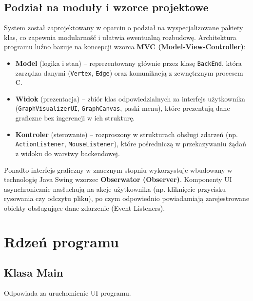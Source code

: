 \documentclass[]{article}
\begin{document}
    
    \clearpage

    \subsection{Podział na moduły i wzorce projektowe}
    System został zaprojektowany w oparciu o podział na wyspecjalizowane pakiety klas, co zapewnia modularność i ułatwia ewentualną rozbudowę. Architektura programu luźno bazuje na koncepcji wzorca \textbf{MVC (Model-View-Controller)}:
    \begin{itemize}
        \item \textbf{Model} (logika i stan) -- reprezentowany głównie przez klasę \texttt{BackEnd}, która zarządza danymi (\texttt{Vertex}, \texttt{Edge}) oraz komunikacją z zewnętrznym procesem C.
        \item \textbf{Widok} (prezentacja) -- zbiór klas odpowiedzialnych za interfejs użytkownika (\texttt{GraphVisualizerUI}, \texttt{GraphCanvas}, paski menu), które prezentują dane graficzne bez ingerencji w ich strukturę.
        \item \textbf{Kontroler} (sterowanie) -- rozproszony w strukturach obsługi zdarzeń (np. \texttt{ActionListener}, \texttt{MouseListener}), które pośredniczą w przekazywaniu żądań z widoku do warstwy backendowej.
    \end{itemize}

    Ponadto interfejs graficzny w znacznym stopniu wykorzystuje wbudowany w technologię Java Swing wzorzec \textbf{Obserwator (Observer)}. Komponenty UI asynchronicznie nasłuchują na akcje użytkownika (np. kliknięcie przycisku rysowania czy odczytu pliku), po czym odpowiednio powiadamiają zarejestrowane obiekty obsługujące dane zdarzenie (Event Listeners).

    \section{Rdzeń programu}

    \subsection{Klasa  Main}
    Odpowiada za uruchomienie UI programu.
\end{document}
